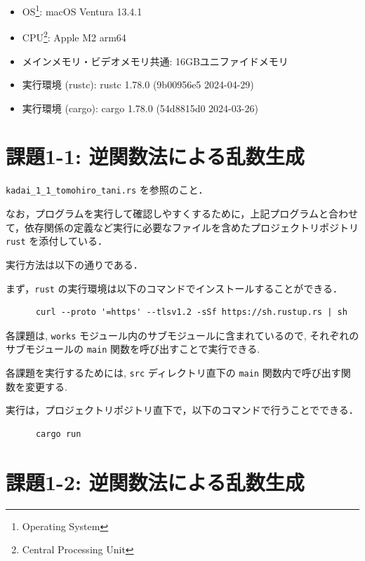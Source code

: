 \documentclass[fleqn, a4paper. 12pt]{jsarticle}
\begin{document}
    \begin{itemize}
      \item OS\footnote{Operating System}: macOS Ventura 13.4.1
      \item CPU\footnote{Central Processing Unit}: Apple M2 arm64\footnotemark[4]
      \item メインメモリ・ビデオメモリ共通: 16GBユニファイドメモリ\footnotemark[4]
      \item 実行環境 (rustc): rustc 1.78.0 (9b00956e5 2024-04-29)
      \item 実行環境 (cargo): cargo 1.78.0 (54d8815d0 2024-03-26)
    \end{itemize}

  \newpage
  \section*{課題1-1: 逆関数法による乱数生成}

    \texttt{kadai\_1\_1\_tomohiro\_tani.rs} を参照のこと．

    \quad

    なお，プログラムを実行して確認しやすくするために，上記プログラムと合わせて，依存関係の定義など実行に必要なファイルを含めたプロジェクトリポジトリ \texttt{rust} を添付している．

    実行方法は以下の通りである．

    まず，\texttt{rust} の実行環境は以下のコマンドでインストールすることができる．

    \begin{verbatim}
      curl --proto '=https' --tlsv1.2 -sSf https://sh.rustup.rs | sh
    \end{verbatim}

    各課題は, \texttt{works} モジュール内のサブモジュールに含まれているので, それぞれのサブモジュールの \texttt{main} 関数を呼び出すことで実行できる.

    各課題を実行するためには, \texttt{src} ディレクトリ直下の \texttt{main} 関数内で呼び出す関数を変更する.

    実行は，プロジェクトリポジトリ直下で，以下のコマンドで行うことでできる．

    \begin{verbatim}
      cargo run
    \end{verbatim}

  \newpage
  \section*{課題1-2: 逆関数法による乱数生成}
\end{document}

